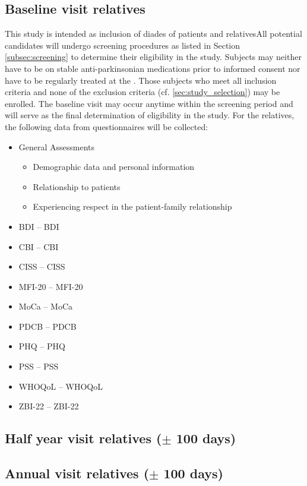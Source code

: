 \subsection{Baseline visit relatives}
This study is intended as inclusion of diades of patients and relativesAll potential candidates will undergo screening procedures as listed in Section \ref{subsec:screening} to determine their eligibility in the study. Subjects may neither have to be on stable anti-parkinsonian medications prior to informed consent nor have to be regularly treated at the \UKGM. Those subjects who meet all inclusion criteria and none of the exclusion criteria (cf. \ref{sec:study_selection}) may be enrolled. The baseline visit may occur anytime within the screening period and will serve as the final  determination of eligibility in the study. For the relatives, the following data from questionnaires will be collected:
\begin{itemize}
\item General Assessments
\begin{itemize}
\item Demographic data and personal information
\item Relationship to patients
\item Experiencing respect in the patient-family relationship
\end{itemize}
\item \acl{BDI} -- \acs{BDI}
\item \acl{CBI} -- \acs{CBI}
\item \acl{CISS} -- \acs{CISS}
\item \acl{MFI-20} -- \acs{MFI-20}
\item \acl{MoCa} -- \acs{MoCa}
\item \acl{PDCB} -- \acs{PDCB}
\item \acl{PHQ} -- \acs{PHQ}
\item \acl{PSS} -- \acs{PSS}
\item \acl{WHOQoL} -- \acs{WHOQoL}
\item \acl{ZBI-22} -- \acs{ZBI-22}
\end{itemize}

\subsection{Half year visit relatives ($\pm$ 100 days)}

\subsection{Annual visit relatives ($\pm$ 100 days)}

